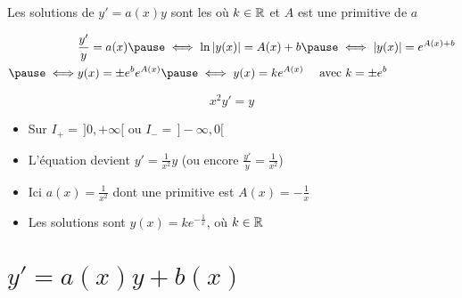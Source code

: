 \begin{frame}
\begin{theoreme}
Les solutions de $y' = a(x) y$ sont les 
où $k\in \mathbb{R}$ et $A$ est une primitive de $a$
\end{theoreme}
\pause
\vspace*{-2ex}
\begin{eqnarray*}
&\frac{y'}{y} =  a(x)
\pause
\iff \ln |y(x)| = A(x) + b
\pause
\iff |y(x)| = e^{A(x)+b} \\
\pause
\iff& y(x) = \pm e^b e^{A(x)}
\pause
\iff y(x) = k e^{A(x)} \quad \text{ avec } k = \pm e^b  
\end{eqnarray*}

\pause
\begin{exemple}
$$x^2y'=y$$
\pause
\vspace*{-4ex}
\begin{itemize}
\item Sur $I_+=\,]0,+\infty[$ ou $I_-=\,]-\infty,0[$
\pause
\item L'équation devient $y'= \frac{1}{x^2}y$ (ou encore $\frac{y'}{y}= \frac{1}{x^2}$)
\pause
\item Ici $a(x)=\frac{1}{x^2}$ dont une primitive est
$A(x)=-\frac1x$
\pause
\item Les solutions sont $y(x) = k e^{-\frac1x}$, où $k\in\mathbb{R}$
\end{itemize}
\end{exemple}

\end{frame}


\section*{$y' = a(x)y+b(x)$}


